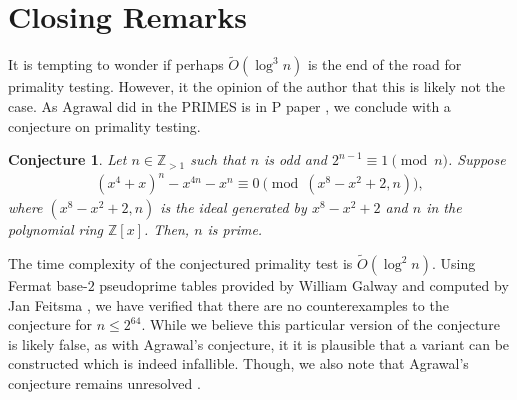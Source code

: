 \documentclass{article}
\theoremstyle{plain}
\newtheorem*{conjecture*}{Conjecture}
\theoremstyle{definition}
\newcommand{\Z}{\mathbb{Z}}
\begin{document}
\section{Closing Remarks}
It is tempting to wonder if perhaps $\tilde{O}(\log^3 n)$ is the end of the road for primality testing. However, it the opinion of the author that this is likely not the case. As Agrawal did in the PRIMES is in P paper \cite{aks2002}, we conclude with a conjecture on primality testing.
\begin{conjecture*}
Let $n \in \mathbb{Z}_{>1}$ such that $n$ is odd and $2^{n-1} \equiv 1 \pmod{n}$. Suppose
\begin{align*}
    (x^4 + x)^n - x^{4n} - x^n \equiv 0 \pmod{(x^8 - x^2 + 2, n)} ,
\end{align*}
where $(x^8 - x^2 + 2, n)$ is the ideal generated by $x^8 - x^2 + 2$ and $n$ in the polynomial ring $\Z[x]$. Then, $n$ is prime.
\end{conjecture*}
The time complexity of the conjectured primality test is $\tilde{O}(\log^2 n)$. Using Fermat base-$2$ pseudoprime tables provided by William Galway and computed by Jan Feitsma \cite{pseudoprimestables}, we have verified that there are no counterexamples to the conjecture for $n \leq 2^{64}$. While we believe this particular version of the conjecture is likely false, as with Agrawal's conjecture, it it is plausible that a variant can be constructed which is indeed infallible. Though, we also note that Agrawal's conjecture remains unresolved \cite{lenstra2003agrawal, popovych2009agrawal}.

\begingroup
\raggedright


\endgroup
\end{document}
